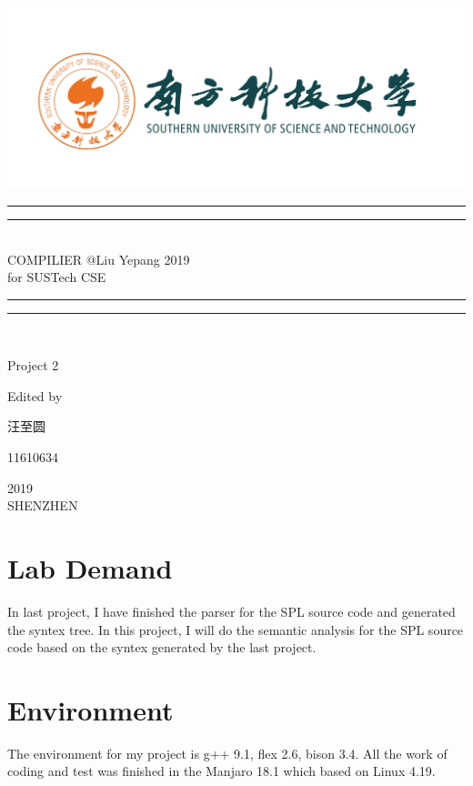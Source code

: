 \documentclass{article}
\begin{document}
 
    \begin{titlepage}       %
        \centering
        \includegraphics[width=\textwidth]{../SUSTC_LOGO.png}
        \rule{\textwidth}{1.6pt}\vspace*{-\baselineskip}\vspace*{2pt}
        \rule{\textwidth}{0.4pt}\\[\baselineskip]
        {\LARGE COMPILIER @Liu Yepang 2019\\[\baselineskip]\small for SUSTech CSE}
        \\[0.2\baselineskip]
        \rule{\textwidth}{0.4pt}\vspace*{-\baselineskip}\vspace{3.2pt}
        \rule{\textwidth}{1.6pt}\\[\baselineskip]
        \scshape
        \vspace*{\baselineskip}
        {\Large Project 2\par }
        Edited by \\[\baselineskip] {汪至圆\par}
        {\Large 11610634\par }
        \vfill
        {\scshape 2019} \\{\large SHENZHEN}\par
    \end{titlepage}

    \section{Lab Demand}
        In last project, I have finished the parser for the SPL source code and generated the syntex 
        tree. In this project, I will do the semantic analysis for the SPL source code based on the syntex 
        generated by the last project.
        

    \section{Environment}
        The environment for my project is g++ 9.1, flex 2.6, bison 3.4. All the work of coding
        and test was finished in the Manjaro 18.1 which based on Linux 4.19.
\end{document}
